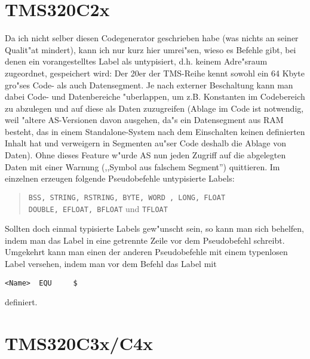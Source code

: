 \documentclass[12pt,a4paper,twoside]{report}
\begin{document}
{%

\section{TMS320C2x}

Da ich nicht selber diesen Codegenerator geschrieben habe (was nichts an
seiner Qualit"at mindert), kann ich nur kurz hier umrei"sen, wieso es
Befehle gibt, bei denen ein vorangestelltes Label als untypisiert, d.h.
keinem Adre"sraum zugeordnet, gespeichert wird:  Der 20er der TMS-Reihe
kennt sowohl ein 64 Kbyte gro"ses Code- als auch Datensegment.  Je nach
externer Beschaltung kann man dabei Code- und Datenbereiche "uberlappen,
um z.B. Konstanten im Codebereich zu abzulegen und auf diese als Daten
zuzugreifen (Ablage im Code ist notwendig, weil "altere AS-Versionen davon
ausgehen, da"s ein Datensegment aus RAM besteht, das in einem
Standalone-System nach dem Einschalten keinen definierten Inhalt hat und
verweigern in Segmenten au"ser Code deshalb die Ablage von Daten).  Ohne
dieses Feature w"urde AS nun jeden Zugriff auf die abgelegten Daten mit
einer Warnung (,,Symbol aus falschem Segment'') quittieren.  Im einzelnen
erzeugen folgende Pseudobefehle untypisierte Labels:
\begin{quote}
  {\tt BSS, STRING, RSTRING, BYTE, WORD , LONG, FLOAT \\
  DOUBLE, EFLOAT, BFLOAT} und {\tt TFLOAT}
\end{quote}
Sollten doch einmal typisierte Labels gew"unscht sein, so kann man sich
behelfen, indem man das Label in eine getrennte Zeile vor dem Pseudobefehl
schreibt.  Umgekehrt kann man einen der anderen Pseudobefehle mit einem
typenlosen Label versehen, indem man vor dem Befehl das Label mit
\begin{verbatim}
<Name>  EQU     $
\end{verbatim}
definiert.


\section{TMS320C3x/C4x}

}
\end{document}
